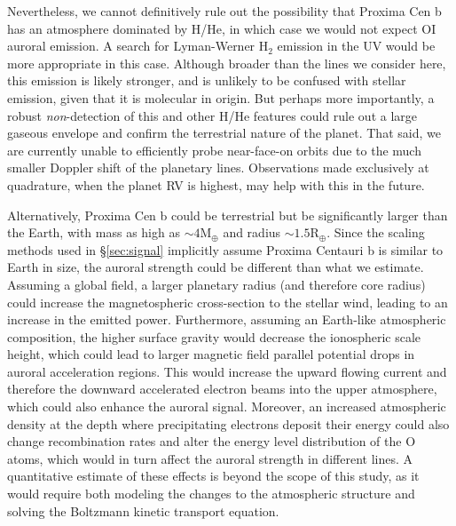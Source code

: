 \documentclass{emulateapj}
\begin{document}
Nevertheless, we cannot definitively rule out the possibility that Proxima Cen b has an atmosphere dominated by H/He, in which case we would not expect OI auroral emission. A search for Lyman-Werner H$_2$ emission in the UV would be more appropriate in this case. Although broader than the lines we consider here, this emission is likely stronger, and is unlikely to be confused with stellar emission, given that it is molecular in origin. But perhaps more importantly, a robust \textit{non}-detection of this and other H/He features could rule out a large gaseous envelope and confirm the terrestrial nature of the planet. That said, we are currently unable to efficiently probe near-face-on orbits due to the much smaller Doppler shift of the planetary lines. Observations made exclusively at quadrature, when the planet RV is highest, may help with this in the future.

Alternatively, Proxima Cen b could be terrestrial but be significantly larger than the Earth, with mass as high as ${\sim}4\mathrm{M}_\oplus$ and radius ${\sim}1.5\mathrm{R}_\oplus$.
Since the scaling methods used in \S\ref{sec:signal} implicitly assume Proxima Centauri b is similar to Earth in size, the auroral strength could be different than what we estimate. Assuming a global field, a larger planetary radius (and therefore core radius) could increase the magnetospheric cross-section to the stellar wind, leading to an increase in the emitted power. Furthermore, assuming an Earth-like atmospheric composition, the higher surface gravity would decrease the ionospheric scale height, which could lead to larger magnetic field parallel potential drops in auroral acceleration regions. This would increase the upward flowing current and therefore the downward accelerated electron beams into the upper atmosphere, which could also enhance the auroral signal. Moreover, an increased atmospheric density at the depth where precipitating electrons deposit their energy could also change recombination rates and alter the energy level distribution of the O atoms, which would in turn affect the auroral strength in different lines. A quantitative estimate of these effects is beyond the scope of this study, as it would require both modeling the changes to the atmospheric structure and solving the Boltzmann kinetic transport equation.
\end{document}
